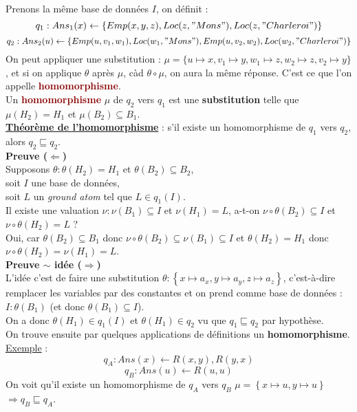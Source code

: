 \documentclass{article}
\newcommand{\dred}[1]{\textcolor{darkred}{\textbf{#1}}}
\newcommand{\stitre}[1]{\noindent\textbf{\underline{#1}}}
\begin{document}
Prenons la même base de données $I$, on définit : 
\[
q_1 : Ans_1(x) \leftarrow \left\{ Emp(x,y,z), Loc(z,"Mons"), Loc(z,"Charleroi")\right\} \]\[
q_2 : Ans_2(u) \leftarrow \left\{ Emp(u,v_1,w_1), Loc(w_1,"Mons"),Emp(u,v_2,w_2),Loc(w_2,"Charleroi") \right\}
\]
On peut appliquer une substitution : $ \mu = \{ u \mapsto x, v_1 \mapsto y, w_1 \mapsto z, w_2 \mapsto z, v_2 \mapsto y\}$, et si on applique $\theta$ après $\mu$, càd 
$\theta\circ\mu$, on aura la même réponse. C'est ce que l'on appelle \dred{homomorphisme}. \\
Un \dred{homomorphisme} $\mu$ de $q_2$ vers $q_1$ est une \textbf{substitution} telle que $\mu(H_2) = H_1$ et $\mu(B_2) \subseteq B_1$. \\

\stitre{Théorème de l'homomorphisme} : s'il existe un homomorphisme de $q_1$ vers $q_2$, alors $q_2 \sqsubseteq q_2$. \\

\noindent\textbf{Preuve ($\Leftarrow$)} \\
\noindent Supposons $\theta : \theta(H_2) = H_1$ et $\theta(B_2) \subseteq B_2$, \\
soit $I$ une base de données, \\
soit $L$ un \textit{ground atom} tel que $L\in q_1(I)$.\\
Il existe une valuation $\nu:\nu(B_1) \subseteq I$ et $\nu(H_1) = L$, a-t-on $\nu \circ \theta(B_2)\subseteq I$ et $\nu \circ \theta(H_2) = L$ ? \\
Oui, car $\theta(B_2) \subseteq B_1$ donc $ \nu \circ \theta(B_2) \subseteq \nu(B_1) \subseteq I$ et $\theta(H_2)=H_1$ donc $\nu \circ \theta(H_2) = \nu(H_1) = L$.\\

\noindent\textbf{Preuve $\sim$ idée ($\Rightarrow$)} \\
\noindent L'idée c'est de faire une substitution $\theta : \left\{x \mapsto a_x, y \mapsto a_y, z \mapsto a_z\right\}$, c'est-à-dire remplacer les variables par des constantes et 
on prend comme base de données : $I : \theta(B_1)$ (et donc $\theta(B_1) \subseteq I$). \\
On a donc $\theta(H_1) \in q_1(I)$ et $\theta(H_1) \in q_2$ vu que $q_1 
\sqsubseteq q_2$ par hypothèse. \\ On trouve ensuite par quelques applications de définitions un \textbf{homomorphisme}.\\

\underline{Exemple} : 
\[
q_A : Ans(x) \leftarrow R(x,y), R(y,x)\]\[
q_B : Ans(u) \leftarrow R(u,u)
\]
On voit qu'il existe un homomorphisme de $q_A$ vers $q_B$ $\mu = \left\{ x \mapsto u, y \mapsto u \right\}$ $\Rightarrow \boxed{q_B \sqsubseteq q_A}$.
\end{document}
